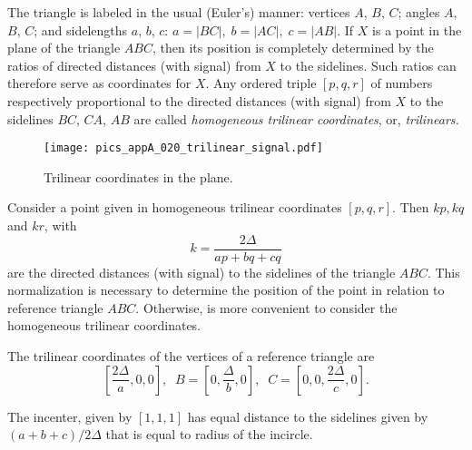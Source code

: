 The triangle is labeled in the usual (Euler's) manner: vertices $A$, $B$, $C$; angles $A$, $B$, $C$;
and sidelengths $a$, $b$, $c$: $a=|BC|,\; b =|AC|,\; c =|AB|$. If $X$ is a point in the plane of
the triangle $ABC$, then its position is completely determined by the ratios of directed distances (with signal)
from $X$ to the sidelines. Such ratios can therefore serve as coordinates for $X$.
Any ordered triple $[p, q,r]$ of numbers respectively proportional to the
directed distances (with signal) from $X$ to the sidelines $BC$, $CA$, $AB$ are called {\em  homogeneous trilinear coordinates}, or,  {\em  trilinears.}

\begin{figure}
    \centering
      \texttt{[image: pics\_appA\_020\_trilinear\_signal.pdf]}
    \caption{Trilinear coordinates in the plane.}
    \label{fig:trilinear_signal}
\end{figure}

Consider a point given in  homogeneous trilinear coordinates $[p,q,r]$.   Then   $kp,kq$ and $kr$, with
%
\[
k=\frac{2\Delta}{ap+bq+cq}
\]
are the directed distances (with signal) to the sidelines of the triangle $ABC$. This normalization is necessary  to      determine the position of the point in relation to reference triangle $ABC$. Otherwise, is more convenient to consider the homogeneous trilinear coordinates.

The trilinear coordinates of the vertices of a reference triangle are
\[ [\frac{2\Delta}{a},0,0],\;\;B=[ 
0,\frac{
	\Delta}{b} ,0],\;\; C=[
0,0,\frac{2\Delta}{c},0].
\]

The incenter, given by $[1,1,1]$ has equal distance to the sidelines given by $(a+b+c)/2\Delta$ that is equal to radius of the incircle.